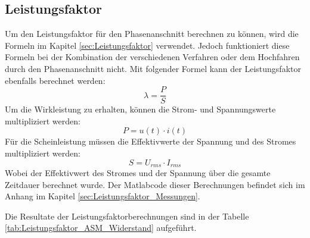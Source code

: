 \newpage
\subsection{Leistungsfaktor}
Um den Leistungsfaktor für den Phasenanschnitt berechnen zu können, wird die Formeln im Kapitel \ref{sec:Leistungsfaktor} verwendet. Jedoch funktioniert diese Formeln bei der Kombination der verschiedenen Verfahren oder dem Hochfahren durch den Phasenanschnitt nicht. Mit folgender Formel kann der Leistungsfaktor ebenfalls berechnet werden:
\begin{equation}
\lambda = \frac{P}{S}
\end{equation}
Um die Wirkleistung zu erhalten, können die Strom- und Spannungswerte multipliziert werden:
\begin{equation}
P = u(t) \cdot i(t)
\end{equation}
Für die Scheinleistung müssen die Effektivwerte der Spannung und des Stromes multipliziert werden:
\begin{equation}
S = U_{rms} \cdot I_{rms}
\end{equation}
Wobei der Effektivwert des Stromes und der Spannung über die gesamte Zeitdauer berechnet wurde. Der Matlabcode dieser Berechnungen befindet sich im Anhang im Kapitel \ref{sec:Leistungsfaktor_Messungen}. 

Die Resultate der Leistungsfaktorberechnungen sind in der Tabelle \ref{tab:Leistungsfaktor_ASM_Widerstand} aufgeführt.

